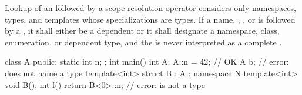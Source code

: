 \pnum
{}%
%
%
Lookup of an 
followed by a \tcode{::} scope resolution operator
considers only
namespaces, types, and templates whose specializations are types.
If a
name,
,
, or
is followed by a \tcode{::},
it shall either be
a dependent  or
it shall designate a namespace, class, enumeration, or dependent type,
and the \tcode{::} is never interpreted as
a complete .
\begin{example}
\begin{codeblock}
class A {
public:
  static int n;
};
int main() {
  int A;
  A::n = 42;            // OK
  A b;                  // error:  does not name a type
}
template<int> struct B : A {};
namespace N {
  template<int> void B();
  int f() {
    return B<0>::n;     // error:  is not a type
  }
}
\end{codeblock}
\end{example}

%
%

